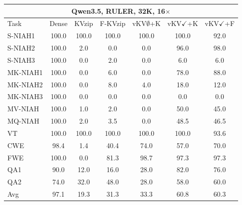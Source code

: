 \begin{tabular}{lcccccc}
\toprule
\multicolumn{7}{c}{Qwen3.5, RULER, 32K, 16$\times$} \\
\midrule
Task & Dense & KVzip & F-KVzip & vKV$\emptyset$+K & vKV$\checkmark$+K & vKV$\checkmark$+F \\
\midrule
S-NIAH1 & 100.0 & 100.0 & 100.0 & 100.0 & 100.0 & 92.0 \\
S-NIAH2 & 100.0 & 2.0 & 0.0 & 0.0 & 96.0 & 98.0 \\
S-NIAH3 & 100.0 & 0.0 & 2.0 & 0.0 & 6.0 & 6.0 \\
MK-NIAH1 & 100.0 & 0.0 & 6.0 & 0.0 & 78.0 & 88.0 \\
MK-NIAH2 & 100.0 & 0.0 & 8.0 & 4.0 & 18.0 & 12.0 \\
MK-NIAH3 & 100.0 & 0.0 & 0.0 & 0.0 & 0.0 & 0.0 \\
MV-NIAH & 100.0 & 1.0 & 2.0 & 0.0 & 50.0 & 45.0 \\
MQ-NIAH & 100.0 & 2.0 & 3.5 & 0.0 & 48.5 & 46.5 \\
VT & 100.0 & 100.0 & 100.0 & 100.0 & 100.0 & 93.6 \\
CWE & 98.4 & 1.4 & 40.4 & 74.0 & 57.0 & 70.0 \\
FWE & 100.0 & 0.0 & 81.3 & 98.7 & 97.3 & 97.3 \\
QA1 & 90.0 & 12.0 & 16.0 & 28.0 & 82.0 & 76.0 \\
QA2 & 74.0 & 32.0 & 48.0 & 28.0 & 58.0 & 60.0 \\
\midrule
Avg & 97.1 & 19.3 & 31.3 & 33.3 & 60.8 & 60.3 \\
\bottomrule
\end{tabular}
\vspace{0.8em}

